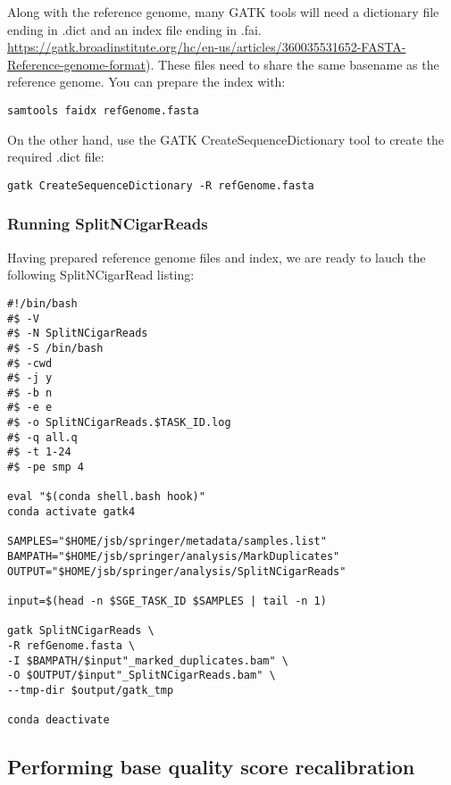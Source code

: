 Along with the reference genome, many GATK tools will need a dictionary file ending in .dict and an index file ending in .fai.\href{ https://gatk.broadinstitute.org/hc/en-us/articles/360035531652-FASTA-Reference-genome-format}{ https://gatk.broadinstitute.org/hc/en-us/articles/360035531652-FASTA-Reference-genome-format}). These files need to share the same basename as the reference genome. You can prepare the index with:

\begin{verbatim}
samtools faidx refGenome.fasta
\end{verbatim}

On the other hand, use the GATK CreateSequenceDictionary tool to create the required .dict file:

\begin{verbatim}
gatk CreateSequenceDictionary -R refGenome.fasta
\end{verbatim}




\subsubsection{Running SplitNCigarReads}

Having prepared reference genome files and index, we are ready to lauch the following SplitNCigarRead listing:

\begin{verbatim}
#!/bin/bash
#$ -V
#$ -N SplitNCigarReads
#$ -S /bin/bash
#$ -cwd
#$ -j y
#$ -b n
#$ -e e
#$ -o SplitNCigarReads.$TASK_ID.log
#$ -q all.q
#$ -t 1-24
#$ -pe smp 4
	
eval "$(conda shell.bash hook)"
conda activate gatk4
	
SAMPLES="$HOME/jsb/springer/metadata/samples.list"
BAMPATH="$HOME/jsb/springer/analysis/MarkDuplicates"
OUTPUT="$HOME/jsb/springer/analysis/SplitNCigarReads"
	
input=$(head -n $SGE_TASK_ID $SAMPLES | tail -n 1)

gatk SplitNCigarReads \
-R refGenome.fasta \
-I $BAMPATH/$input"_marked_duplicates.bam" \
-O $OUTPUT/$input"_SplitNCigarReads.bam" \
--tmp-dir $output/gatk_tmp
	
conda deactivate
\end{verbatim}



\subsection{Performing base quality score recalibration}

